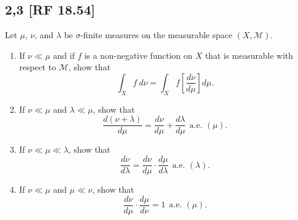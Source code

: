\documentclass[12pt]{article}
\begin{document}
\subsection*{2,3 [RF 18.54]}
\begin{tcolorbox}
  Let $\mu$, $\nu$, and $\lambda$ be $\sigma$-finite measures on the measurable space $(X, \mathcal{M})$.
  \begin{enumerate}[label = (\roman*)]
    \item If $\nu \ll \mu$ and if $f$ is a non-negative function on $X$ that is measurable with respect to $\mathcal{M}$, show that 
      \[ \int_{X} f\ d\nu = \int_{X}f\left[ \frac{d\nu}{d\mu} \right]d\mu. \]
    \item If $\nu \ll \mu$ and $\lambda \ll \mu$, show that 
      \[ \frac{d(\nu + \lambda)}{d\mu} = \frac{d\nu}{d\mu} + \frac{d\lambda}{d\mu}\ \ \text{a.e. $(\mu)$}. \]
    \item If $\nu \ll \mu \ll \lambda$, show that 
      \[ \frac{d\nu}{d\lambda} = \frac{d\nu}{d\mu}\cdot \frac{d\mu}{d\lambda}\  \ \text{a.e. $(\lambda)$}. \]
    \item If $\nu \ll \mu$ and $\mu \ll \nu$, show that 
      \[ \frac{d\nu}{d\mu}\cdot \frac{d\mu}{d\nu} = 1 \ \ \text{a.e. $(\mu)$}. \]
  \end{enumerate}
\end{tcolorbox}
\end{document}

